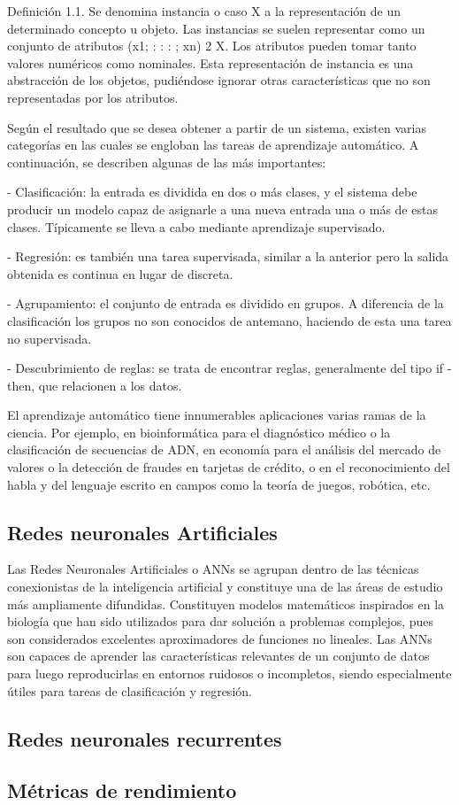 Definición 1.1. Se denomina instancia o caso X a la representación de un determinado concepto u objeto. Las instancias se suelen representar como un conjunto de atributos (x1; : : : ; xn) 2 X.
Los atributos pueden tomar tanto valores numéricos como nominales. Esta representación de instancia es una abstracción de los objetos, pudiéndose ignorar otras características que no son representadas por los atributos.

Según el resultado que se desea obtener a partir de un sistema, existen varias categorías en las cuales se engloban las tareas de aprendizaje automático. A continuación, se describen algunas de las más importantes:

- Clasificación: la entrada es dividida en dos o más clases, y el sistema debe producir un modelo capaz de asignarle a una nueva entrada una o más de estas clases. Típicamente se lleva a cabo mediante aprendizaje supervisado.

- Regresión: es también una tarea supervisada, similar a la anterior pero la salida obtenida es continua en lugar de discreta.

- Agrupamiento: el conjunto de entrada es dividido en grupos. A diferencia de la clasificación los grupos no son conocidos de antemano, haciendo de esta una tarea no supervisada.

- Descubrimiento de reglas: se trata de encontrar reglas, generalmente del tipo if -then, que relacionen a los datos.

El aprendizaje automático tiene innumerables aplicaciones varias ramas de la ciencia. Por ejemplo, en bioinformática para el diagnóstico médico o la clasificación de secuencias de ADN, en economía para el análisis del mercado de valores o la detección de fraudes en tarjetas de crédito, o en el reconocimiento del habla y del lenguaje escrito en campos como la teoría de juegos, robótica, etc.\cite{Mitchell1997}

 


\subsection{Redes neuronales Artificiales}
Las Redes Neuronales Artificiales o ANNs se agrupan dentro de las técnicas conexionistas de la inteligencia artificial y constituye una de las áreas de estudio más ampliamente difundidas. Constituyen modelos matemáticos inspirados en la biología que han sido utilizados para dar solución a problemas complejos, pues son considerados excelentes aproximadores de funciones no lineales. Las ANNs son capaces de aprender las características relevantes de un conjunto de datos para luego reproducirlas en entornos ruidosos o incompletos, siendo especialmente útiles para tareas de clasificación y regresión.\cite{Hammer2003}

\subsection{Redes neuronales recurrentes}
\lipsum[2]

\subsection{Métricas de rendimiento}
\lipsum[2]
\clearpage

